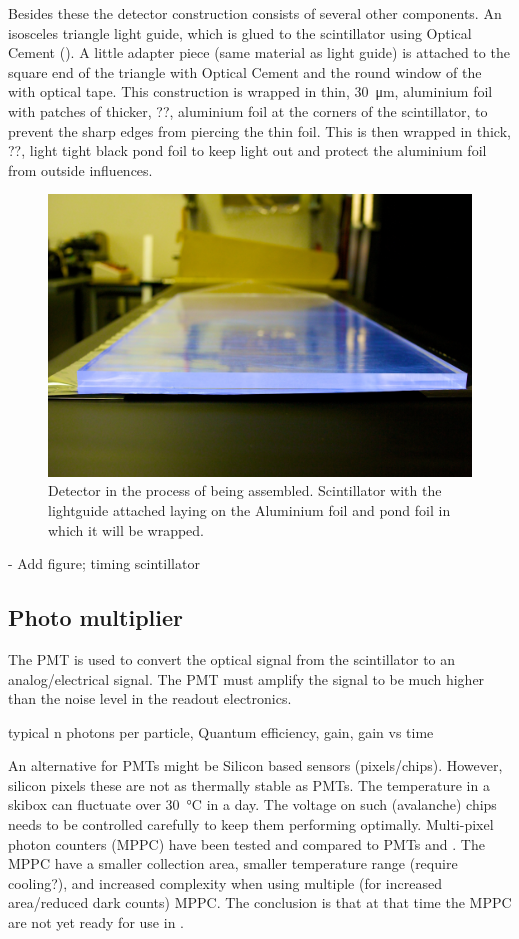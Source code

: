 Besides these the detector construction consists of several other components. An isosceles triangle light guide, which is glued to the scintillator using Optical Cement (\cite{bc600}). A little adapter piece (same material as light guide) is attached to the square end of the triangle with Optical Cement and the round window of the \pmt with optical tape. This construction is wrapped in thin, \SI{30}{\micro\meter}, aluminium foil with patches of thicker, ??, aluminium foil at the corners of the scintillator, to prevent the sharp edges from piercing the thin foil. This is then wrapped in thick, ??, light tight black pond foil to keep light out and protect the aluminium foil from outside influences.

\begin{figure}
    \centering
    \includegraphics[width=.6\textwidth]{plots/experiment/ADL_115651}
    \caption{Detector in the process of being assembled. Scintillator with the lightguide attached laying on the Aluminium foil and pond foil in which it will be wrapped.}
    \label{fig:scintillator}
\end{figure}


- Add figure; timing scintillator


\subsection{Photo multiplier}

The PMT is used to convert the optical signal from the scintillator to an analog/electrical signal. The PMT must amplify the signal to be much higher than the noise level in the readout electronics.

typical n photons per particle, Quantum efficiency, gain, gain vs time

An alternative for PMTs might be Silicon based sensors (pixels/chips). However, silicon pixels these are not as thermally stable as PMTs. The temperature in a \hisparc skibox can fluctuate over \SI{30}{\degreeCelsius} in a day. The voltage on such (avalanche) chips needs to be controlled carefully to keep them performing optimally. Multi-pixel photon counters (MPPC) have been tested and compared to PMTs \cite[Chapter~3.4]{lio2011} and \cite[Chapter~3.6]{lio2010}. The MPPC have a smaller collection area, smaller temperature range (require cooling?), and increased complexity when using multiple (for increased area/reduced dark counts) MPPC. The conclusion is that at that time the MPPC are not yet ready for use in \hisparc.


